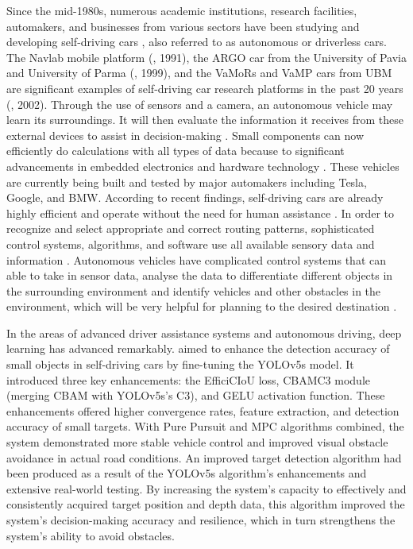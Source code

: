 \documentclass[pdflatex,sn-mathphys-num]{sn-jnl}%
\theoremstyle{thmstyleone}%
\theoremstyle{thmstyletwo}%
\theoremstyle{thmstylethree}%
\begin{document}
Since the mid-1980s, numerous academic institutions, research facilities, automakers, and businesses from various sectors have been studying and developing self-driving cars \cite{badue2021self}, also referred to as autonomous or driverless cars.  The Navlab mobile platform (\citet{thorpe2002toward}, 1991), the ARGO car from the University of Pavia and University of Parma (\citet{broggi1999argo}, 1999), and the VaMoRs and VaMP cars from UBM are significant examples of self-driving car research platforms in the past 20 years (\citet{gregor2002ems}, 2002). Through the use of sensors and a camera, an autonomous vehicle may learn its surroundings. It will then evaluate the information it receives from these external devices to assist in decision-making \cite{shreyas2020self}.  Small components can now efficiently do calculations with all types of data because to significant advancements in embedded electronics and hardware technology \cite{shreyas2020self}.  These vehicles are currently being built and tested by major automakers including Tesla, Google, and BMW.  According to recent findings, self-driving cars are already highly efficient and operate without the need for human assistance \cite{tian2018deeptest}.  In order to recognize and select appropriate and correct routing patterns, sophisticated control systems, algorithms, and software use all available sensory data and information \cite{vishnukumar2017machine}. Autonomous vehicles have complicated control systems that can able to take in sensor data, analyse the data to differentiate different objects in the surrounding environment and identify vehicles and other obstacles in the environment, which will be very helpful for planning to the desired destination \cite{zhu2014vehicle}. 

In the areas of advanced driver assistance systems and autonomous driving, deep learning has advanced remarkably. \citet{qiu2024machine} aimed to enhance the detection accuracy of small objects in self-driving cars by fine-tuning the YOLOv5s model. It introduced three key enhancements: the EfficiCIoU loss, CBAMC3 module (merging CBAM with YOLOv5s's C3), and GELU activation function. These enhancements offered higher convergence rates, feature extraction, and detection accuracy of small targets. With Pure Pursuit and MPC algorithms combined, the system demonstrated more stable vehicle control and improved visual obstacle avoidance in actual road conditions. An improved target detection algorithm had been produced as a result of the YOLOv5s algorithm's enhancements and extensive real-world testing.  By increasing the system's capacity to effectively and consistently acquired target position and depth data, this algorithm improved the system's decision-making accuracy and resilience, which in turn strengthens the system's ability to avoid obstacles.
\end{document}
